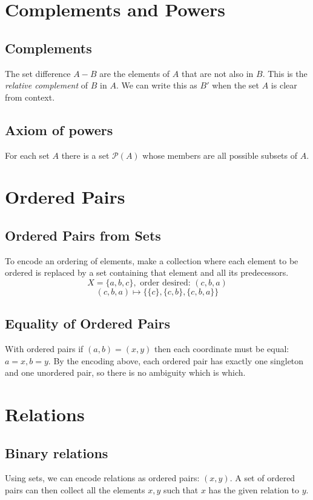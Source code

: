 \documentclass{article}
\begin{document}
\section{Complements and Powers}

\subsection{Complements} The set difference $A - B$ are the elements of $A$ that are not also in $B$. This is the \textit{relative complement} of $B$ in $A$. We can write this as $B'$ when the set $A$ is clear from context.

\subsection{Axiom of powers} For each set $A$ there is a set $\mathcal{P}(A)$ whose members are all possible subsets of $A$. 

\section{Ordered Pairs}

\subsection{Ordered Pairs from Sets} To encode an ordering of elements, make a collection where each element to be ordered is replaced by a set containing that element and all its predecessors.
$$X = \{a, b, c\}, \text{ order desired: } (c, b, a)$$
$$(c, b, a) \longmapsto \{\{c\}, \{c, b\}, \{c, b, a\}\}$$

\subsection{Equality of Ordered Pairs} With ordered pairs if $(a, b) = (x, y)$ then each coordinate must be equal: $a = x, b = y$. By the encoding above, each ordered pair has exactly one singleton and one unordered pair, so there is no ambiguity which is which.

\section{Relations}

\subsection{Binary relations} Using sets, we can encode relations as ordered pairs: $(x, y)$. A set of ordered pairs can then collect all the elements $x, y$ such that $x$ has the given relation to $y$.
\end{document}
